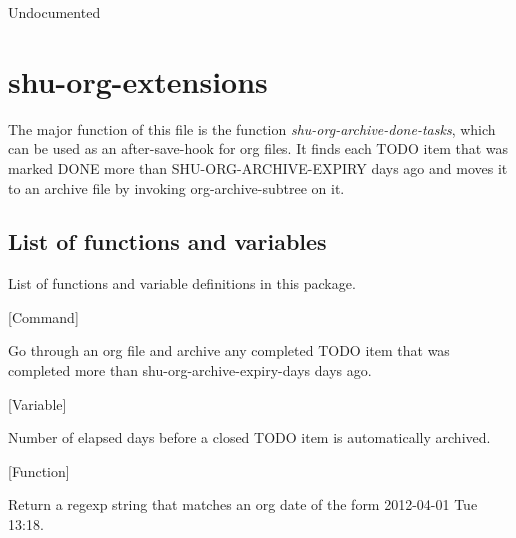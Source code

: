 \begin{doc-string}
Undocumented
\end{doc-string}

\section{shu-org-extensions}


The major function of this file is the function \emph{shu-org-archive-done-tasks},
which can be used as an after-save-hook for org files.  It finds each
TODO item that was marked DONE more than SHU-ORG-ARCHIVE-EXPIRY days
ago and moves it to an archive file by invoking org-archive-subtree
on it.


\subsection{List of functions and variables}

List of functions and variable definitions in this package.



\vspace{1em}
\noindent
{}
\usebox{\funcname}
 \hfill [Command]

\begin{doc-string}
Go through an org file and archive any completed TODO item that was completed more
than shu-org-archive-expiry-days days ago.
\end{doc-string}

\vspace{1em}
\noindent
{}
\usebox{\funcname}
 \hfill [Variable]

\begin{doc-string}
Number of elapsed days before a closed TODO item is automatically archived.
\end{doc-string}

\vspace{1em}
\noindent
{}
\usebox{\funcname}
 \hfill [Function]

\begin{doc-string}
Return a regexp string that matches an org date of the form 2012-04-01 Tue 13:18.
\end{doc-string}

